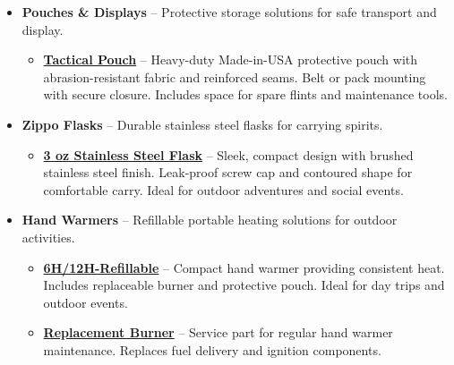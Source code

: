 \documentclass[11pt]{article}
\begin{document}
\begin{itemize}
    \begin{itemize}
      \item \href{https://zippo.com/collections/flints-wicks}{\textbf{Standard Wick/Flint Insert}} -- Original 
      insert assembly with wick, chimney, cotton packing, and flint tube. Easy one-handed replacement restores 
      optimal flame height and reliability. Keep spare flints and wicks on hand.
      \item \href{https://zippo.com/products/pipe-insert}{\textbf{Pipe Insert}} -- Specialized low-flame insert 
      for pipe smokers. Features narrower chimney and modified wick arrangement for controlled, directed flame. 
      Reversible installation with cooler case temperatures and improved fuel economy.
    \end{itemize}
  \item \textbf{Pouches \& Displays} -- Protective storage solutions for safe transport and display.
    \begin{itemize}
      \item \href{https://zippo.com/products/tactical-pouch}{\textbf{Tactical Pouch}} -- Heavy-duty Made-in-USA 
      protective pouch with abrasion-resistant fabric and reinforced seams. Belt or pack mounting with secure 
      closure. Includes space for spare flints and maintenance tools.
    \end{itemize}
  \item \textbf{Zippo Flasks} -- Durable stainless steel flasks for carrying spirits.
    \begin{itemize}
      \item \href{https://zippo.com/products/zippo-flask-lighter-gift-set-new}{\textbf{3 oz Stainless Steel Flask}} -- 
      Sleek, compact design with brushed stainless steel finish. Leak-proof screw cap and contoured shape for 
      comfortable carry. Ideal for outdoor adventures and social events.
    \end{itemize}
  \item \textbf{Hand Warmers} -- Refillable portable heating solutions for outdoor activities.
    \begin{itemize}
      \item \href{https://zippo.com/collections/refillable}{\textbf{6H/12H-Refillable}} -- Compact 
      hand warmer providing consistent heat. Includes replaceable burner and protective pouch. 
      Ideal for day trips and outdoor events.
      \item \href{https://zippo.com/products/refillable-hand-warmer-replacement-burner}{\textbf{Replacement Burner}} -- Service 
      part for regular hand warmer maintenance. Replaces fuel delivery and ignition components. 
    \end{itemize}
\end{itemize}


\end{document}
